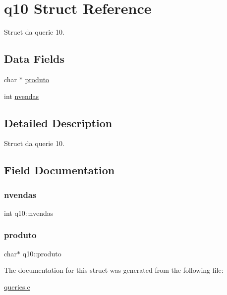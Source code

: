 \hypertarget{structq10}{}\section{q10 Struct Reference}
\label{structq10}


Struct da querie 10.  


\subsection*{Data Fields}
\begin{DoxyCompactItemize}
\item 
char $\ast$ \mbox{\hyperlink{structq10_a2675a04d270bb75447787a20cd416208}{produto}}
\item 
int \mbox{\hyperlink{structq10_aa3527024a02ab1afd61f6704776feb1a}{nvendas}}
\end{DoxyCompactItemize}


\subsection{Detailed Description}
Struct da querie 10. 



\subsection{Field Documentation}
\mbox{\label{structq10_aa3527024a02ab1afd61f6704776feb1a}} 
\subsubsection{\texorpdfstring{nvendas}{nvendas}}
{\footnotesize\ttfamily int q10\+::nvendas}

\mbox{\label{structq10_a2675a04d270bb75447787a20cd416208}} 
\subsubsection{\texorpdfstring{produto}{produto}}
{\footnotesize\ttfamily char$\ast$ q10\+::produto}



The documentation for this struct was generated from the following file\+:\begin{DoxyCompactItemize}
\item 
\mbox{\hyperlink{queries_8c}{queries.\+c}}\end{DoxyCompactItemize}
